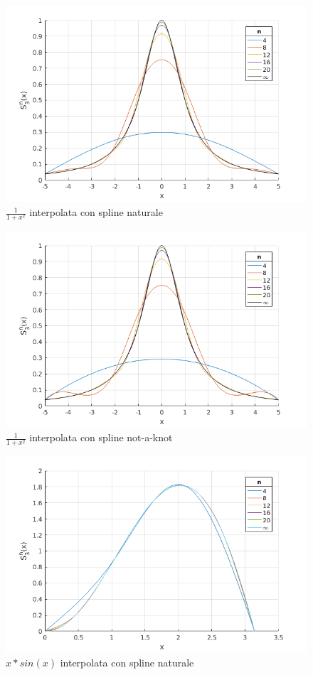 \begin{figure}
\centering
\includegraphics[scale=0.5]{cap_4/es5/runge_nat}
\caption{$\frac{1}{1+x^2}$ interpolata con spline naturale}
\label{plot_runge_nat}
\end{figure}


\begin{figure}
\centering
\includegraphics[scale=0.43]{cap_4/es5/runge_nak}
\caption{$\frac{1}{1+x^2}$ interpolata con spline not-a-knot}
\label{plot_runge_nak}
\end{figure}

\begin{figure}
\centering
\includegraphics[scale=0.5]{cap_4/es5/sin_nat}
\caption{$x*sin(x)$ interpolata con spline naturale}
\label{plot_sin_nat}
\end{figure}


